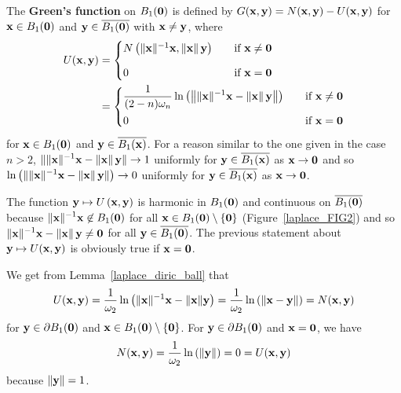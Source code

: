 The {\bfseries Green's function} on $B_1(\mathbf{0})$ is
defined by $G(\mathbf{x},\mathbf{y}) = N(\mathbf{x},\mathbf{y}) - U(\mathbf{x},\mathbf{y})$
for $\mathbf{x} \in B_1(\mathbf{0})$ and $\mathbf{y} \in \overline{B_1(\mathbf{0})}$ with
$\mathbf{x} \neq \mathbf{y}$, where
\begin{align*}
U(\mathbf{x},\mathbf{y}) &=
\begin{cases}
N\left(\|\mathbf{x}\|^{-1} \mathbf{x},\|\mathbf{x}\|\,\mathbf{y}\right) &
\quad \text{if} \ \mathbf{x} \neq \mathbf{0} \\[0.8em]
0 & \quad \text{if} \ \mathbf{x} = \mathbf{0}
\end{cases} \\
&= \begin{cases}
\displaystyle \frac{1}{(2-n)\omega_n}
\ln\left( \left\| \|\mathbf{x}\|^{-1}\mathbf{x} - \|\mathbf{x}\|\,\mathbf{y}\right\|\right)
& \quad \text{if} \ \mathbf{x} \neq \mathbf{0} \\[0.8em]
0 & \quad \text{if} \ \mathbf{x} = \mathbf{0}
\end{cases}
\end{align*}
for $\mathbf{x} \in B_1(\mathbf{0})$ and $\mathbf{y} \in \overline{B_1(\mathbf{x})}$.
For a reason similar to the one given in the case $n>2$,
$\displaystyle
\| \|\mathbf{x}\|^{-1} \mathbf{x}- \|\mathbf{x}\|\,\mathbf{y} \| \rightarrow 1$
uniformly for $\mathbf{y} \in \overline{B_1(\mathbf{x})}$ as
$\mathbf{x} \rightarrow \mathbf{0}$ and so $\displaystyle
\ln\left(\| \|\mathbf{x}\|^{-1} \mathbf{x}- \|\mathbf{x}\|\, \mathbf{y} \|\right)
\rightarrow 0$ uniformly for $\mathbf{y} \in \overline{B_1(\mathbf{x})}$
as $\mathbf{x} \rightarrow \mathbf{0}$.

The function $\mathbf{y} \mapsto U\left(\mathbf{x},\mathbf{y}\right)$
is harmonic in $B_1(\mathbf{0})$ and
continuous on $\overline{B_1(\mathbf{0})}$ because
$\displaystyle \|\mathbf{x}\|^{-1}\mathbf{x} \not\in B_1(\mathbf{0})$ for all
$\mathbf{x} \in B_1(\mathbf{0})\setminus \{\mathbf{0}\}$
(Figure~\ref{laplace_FIG2}) and so
$\displaystyle \|\mathbf{x}\|^{-1}\mathbf{x} -\|\mathbf{x}\|\,\mathbf{y} \neq \mathbf{0}$
for all $\mathbf{y} \in \overline{B_1(\mathbf{0})}$.
The previous statement about
$\mathbf{y} \mapsto U(\mathbf{x},\mathbf{y})$ is obviously true
if $\mathbf{x} = \mathbf{0}$.

We get from Lemma~\ref{laplace_diric_ball} that
\[
U(\mathbf{x},\mathbf{y}) = \frac{1}{\omega_2}
\ln \left( \|\mathbf{x}\|^{-1}\mathbf{x} - \|\mathbf{x}\|\mathbf{y}\right)
= \frac{1}{\omega_2} \ln \left( \|\mathbf{x} - \mathbf{y}\| \right)
= N(\mathbf{x},\mathbf{y})
\]
for $\mathbf{y} \in \partial B_1(\mathbf{0})$ and
$\mathbf{x} \in B_1(\mathbf{0})\setminus \{\mathbf{0}\}$.  For
$\mathbf{y} \in \partial B_1(\mathbf{0})$ and $\mathbf{x} = \mathbf{0}$, we have
\[
N(\mathbf{x},\mathbf{y}) = \frac{1}{\omega_2} \ln \left(\|\mathbf{y}\|\right)
= 0 = U(\mathbf{x},\mathbf{y})
\]
because $\|\mathbf{y}\|=1$.

